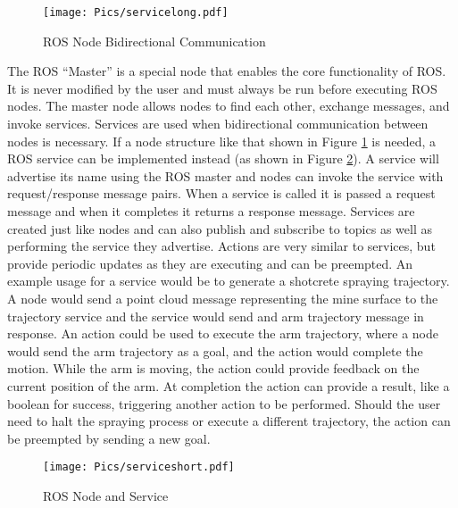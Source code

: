 \begin{figure}[h!]
    \centering
    \texttt{[image: Pics/servicelong.pdf]}
    \caption{ROS Node Bidirectional Communication}
    \label{fig:rosservicelong}
\end{figure}

The ROS ``Master'' is a special node that enables the core functionality of ROS. It is never modified by the user and must always be run before executing ROS nodes. The master node allows nodes to find each other, exchange messages, and invoke services. Services are used when bidirectional communication between nodes is necessary. If a node structure like that shown in Figure \ref{fig:rosservicelong} is needed, a ROS service can be implemented instead (as shown in Figure \ref{fig:rosservice}). A service will advertise its name using the ROS master and nodes can invoke the service with request/response message pairs. When a service is called it is passed a request message and when it completes it returns a response message. Services are created just like nodes and can also publish and subscribe to topics as well as performing the service they advertise. Actions are very similar to services, but provide periodic updates as they are executing and can be preempted. An example usage for a service would be to generate a shotcrete spraying trajectory. A node would send a point cloud message representing the mine surface to the trajectory service and the service would send and arm trajectory message in response. An action could be used to execute the arm trajectory, where a node would send the arm trajectory as a goal, and the action would complete the motion. While the arm is moving, the action could provide feedback on the current position of the arm. At completion the action can provide a result, like a boolean for success, triggering another action to be performed. Should the user need to halt the spraying process or execute a different trajectory, the action can be preempted by sending a new goal.\\

\begin{figure}[h!]
    \centering
    \texttt{[image: Pics/serviceshort.pdf]}
    \caption{ROS Node and Service}
    \label{fig:rosservice}
\end{figure}

